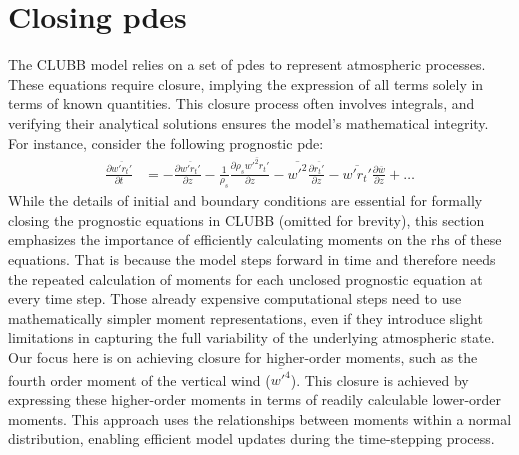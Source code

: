 \section{Closing pdes}\label{sec:closing_pdes}

The \gls{CLUBB} model relies on a set of \glspl{pde} to represent atmospheric processes.
These equations require closure,
implying the expression of all terms solely in terms of known quantities.
This closure process often involves integrals,
and verifying their analytical solutions ensures the model's mathematical integrity.
For instance, consider the following prognostic {\gls{pde}\autocite[p. 21]{larson2022clubbsilhs}}:
\begin{align*}
    \frac{\partial \overline{w'r_t'}}{\partial t}
    &= -\frac{\partial \overline{w'r_t'}}{\partial z}
    - \frac{1}{\rho_s} \frac{\partial \rho_s \overline{w'^2 r_t'}}{\partial z}
    - \overline{w'^2} \frac{\partial \overline{r_t'}}{\partial z}
    - \overline{w'r_t'} \frac{\partial \overline{w}}{\partial z}
    + \ldots
\end{align*}
While the details of initial and boundary conditions are essential
for formally closing the prognostic equations in \gls{CLUBB} (omitted for brevity),
this section emphasizes the importance of efficiently calculating moments
on the \gls{rhs} of these equations.
That is because the model steps forward in time
and therefore needs the repeated calculation of moments
for each unclosed prognostic equation at every time step.
Those already expensive computational steps need to use mathematically simpler moment representations,
even if they introduce slight limitations
in capturing the full variability of the underlying atmospheric state.
Our focus here is on achieving closure for higher-order moments,
such as the fourth order moment of the vertical wind ($\overline{w'^4}$).
This closure is achieved by expressing these higher-order moments
in terms of readily calculable lower-order moments.
This approach uses the relationships between moments within a normal distribution,
enabling efficient model updates during the time-stepping process.